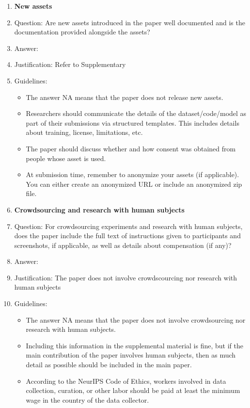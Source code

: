 \documentclass{article}
\begin{document}
\begin{enumerate}
\item {\bf New assets}
    \item[] Question: Are new assets introduced in the paper well documented and is the documentation provided alongside the assets?
    \item[] Answer: \answerYes{} %
    \item[] Justification: Refer to Supplementary
    \item[] Guidelines:
    \begin{itemize}
        \item The answer NA means that the paper does not release new assets.
        \item Researchers should communicate the details of the dataset/code/model as part of their submissions via structured templates. This includes details about training, license, limitations, etc. 
        \item The paper should discuss whether and how consent was obtained from people whose asset is used.
        \item At submission time, remember to anonymize your assets (if applicable). You can either create an anonymized URL or include an anonymized zip file.
    \end{itemize}

\item {\bf Crowdsourcing and research with human subjects}
    \item[] Question: For crowdsourcing experiments and research with human subjects, does the paper include the full text of instructions given to participants and screenshots, if applicable, as well as details about compensation (if any)? 
    \item[] Answer: \answerNA{} %
    \item[] Justification: The paper does not involve crowdscourcing nor research with human subjects
    \item[] Guidelines:
    \begin{itemize}
        \item The answer NA means that the paper does not involve crowdsourcing nor research with human subjects.
        \item Including this information in the supplemental material is fine, but if the main contribution of the paper involves human subjects, then as much detail as possible should be included in the main paper. 
        \item According to the NeurIPS Code of Ethics, workers involved in data collection, curation, or other labor should be paid at least the minimum wage in the country of the data collector. 
    \end{itemize}


\end{enumerate}
\end{document}
